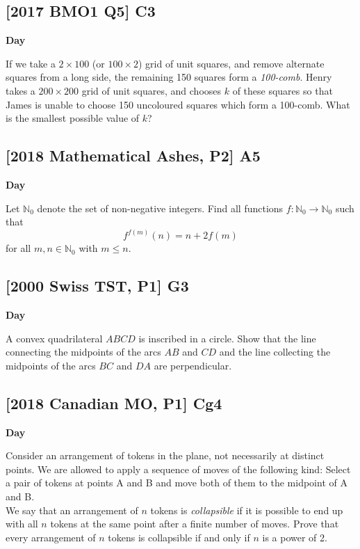 \documentclass[10pt]{article}
\newcommand{\themonth}{March}
\newcommand{\theyear}{2019}
\newcounter{day}
\newcounter{solution}
\newcounter{datenumber}
\newcommand{\problem}[4][0]{
	\newpage
	\subsection{[#3] \space #2} \hfill 
	{\large\textbf{Day \arabic{day}}} %
	\begin{flushleft} #4 \end{flushleft}
	\vspace{1em}
	\addtocounter{day}{1}
	\addtocounter{datenumber}{1}
	\setcounter{solution}{1}
}
\begin{document}
\problem[109]{C3}{2017 BMO1 Q5}{If we take a \(2 \times 100\) (or \(100 \times 2\)) grid of unit squares, and remove alternate squares from a long side, the remaining 150 squares form a \textit{100-comb}. Henry takes a \(200 \times 200\) grid of unit squares, and chooses \(k\) of these squares so that James is unable to choose 150 uncoloured squares which form a 100-comb. What is the smallest possible value of \(k\)?}

\problem[110]{A5}{2018 Mathematical Ashes, P2}{Let \(\mathbb{N}_0\) denote the set of non-negative integers. Find all functions \(f:\mathbb{N}_0\to\mathbb{N}_0\) such that
	\[f^{f(m)}(n) = n + 2f(m)\]
	for all \(m,n \in \mathbb{N}_0\) with \(m \leq n\).}

\problem[111]{G3}{2000 Swiss TST, P1}{A convex quadrilateral \(ABCD\) is inscribed in a circle. Show that the line connecting the midpoints of the arcs \(AB\) and \(CD\) and the line collecting the midpoints of the arcs \(BC\) and \(DA\) are perpendicular.}

\problem[112]{Cg4}{2018 Canadian MO, P1}{Consider an arrangement of tokens in the plane, not necessarily at distinct points. We are allowed to apply a sequence of moves of the following kind: Select a pair of tokens at points A and B and move both of them to the midpoint of A and B.\\
	We say that an arrangement of \(n\) tokens is \textit{collapsible} if it is possible to end up with all \(n\) tokens at the same point after a finite number of moves. Prove that every arrangement of \(n\) tokens is collapsible if and only if \(n\) is a power of 2.}
\end{document}
